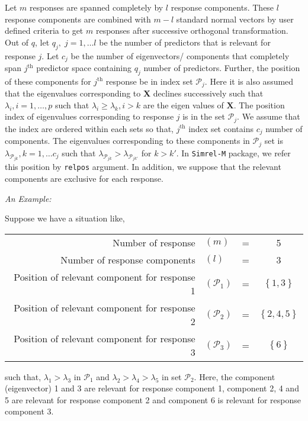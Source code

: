 \documentclass[12pt,a4paperpaper,authoryear]{elsarticle} %
\begin{document}
Let \(m\) responses are spanned completely by \(l\) response components.
These \(l\) response components are combined with \(m-l\) standard
normal vectors by user defined criteria to get \(m\) responses after
successive orthogonal transformation. Out of \(q\), let
\(q_j,\; j = 1, \ldots l\) be the number of predictors that is relevant
for response \(j\). Let \(c_j\) be the number of eigenvectors/
components that completely span \(j^\text{th}\) predictor space
containing \(q_j\) number of predictors. Further, the position of these
components for \(j^\text{th}\) response be in index set
\(\mathcal{P}_j\). Here it is also assumed that the eigenvalues
corresponding to \(\mathbf{X}\) declines successively such that
\(\lambda_i, i = 1, \ldots, p\) such that
\(\lambda_i \ge \lambda_k, i > k\) are the eigen values of
\(\mathbf{X}\). The position index of eigenvalues corresponding to
response \(j\) is in the set \(\mathcal{P}_j\). We assume that the index
are ordered within each sets so that, \(j^\text{th}\) index set contains
\(c_j\) number of components. The eigenvalues corresponding to these
components in \(\mathcal{P}_j\) set is
\(\lambda_{\mathcal{P}_{jk}}, k = 1, \ldots c_j\) such that
\(\lambda_{\mathcal{P}_{jk}} > \lambda_{\mathcal{P}_{jk'}}\) for
\(k > k'\). In \texttt{Simrel-M} package, we refer this position by
\texttt{relpos} argument. In addition, we suppose that the relevant
components are exclusive for each response.

\emph{An Example:}

Suppose we have a situation like,

\begin{longtable}[]{@{}rlcc@{}}
\toprule
Number of response & \((m)\) & = & 5\tabularnewline
Number of response components & \((l)\) & = & 3\tabularnewline
Position of relevant component for response 1 & \((\mathcal{P}_1)\) & =
& \(\left\{ 1, 3 \right\}\)\tabularnewline
Position of relevant component for response 2 & \((\mathcal{P}_2)\) & =
& \(\left\{ 2, 4, 5 \right\}\)\tabularnewline
Position of relevant component for response 3 & \((\mathcal{P}_3)\) & =
& \(\left\{ 6 \right\}\)\tabularnewline
\bottomrule
\end{longtable}

such that, \(\lambda_1 > \lambda_3\) in \(\mathcal{P}_1\) and
\(\lambda_2 > \lambda_4 > \lambda_5\) in set \(\mathcal{P}_2\). Here,
the component (eigenvector) 1 and 3 are relevant for response component
1, component 2, 4 and 5 are relevant for response component 2 and
component 6 is relevant for response component 3.
\end{document}
